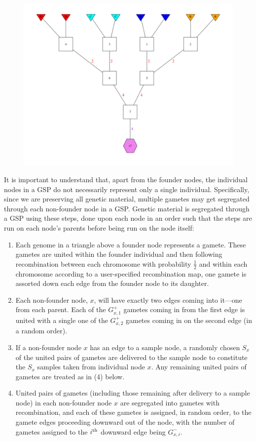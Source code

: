 \begin{figure}
\begin{center}
\includegraphics[width=\columnwidth]{images/gsp4-700.pdf}
\end{center}
\caption[\gspcapone]{\gspcapone}
\label{fig:gsp1}
\end{figure}
It is important to understand that, apart from the founder nodes, the individual
nodes in a GSP do not necessarily represent only a single individual.  Specifically,
since we are preserving all genetic material, multiple gametes may get segregated
through each non-founder node in a GSP\@.   Genetic material is segregated through
a GSP using these steps, done upon each node in an order such that the steps
are run on each node's parents before being run on the node itself:
\begin{enumerate}
\item Each genome in a triangle above a founder node represents a gamete.
These gametes are united within the founder individual and then
following recombination between each chromosome
with probability $\frac{1}{2}$ and within each chromosome according to
a user-specified recombination map, 
 one gamete is assorted down each edge from the founder node to its daughter.
\item Each non-founder node, $x$, will have exactly two edges coming
into it---one from each parent.  Each of the $G^+_{x,1}$ gametes coming in from the
first edge is united with a single one of the $G^+_{x,2}$ gametes coming
in on the second edge (in a random order). 
\item If a non-founder node $x$ has an edge to a sample node,
a randomly chosen $S_x$ of the united pairs of gametes are delivered
to the sample node to constitute the $S_x$ samples taken from individual
node $x$. Any remaining united pairs of gametes are treated as in (4) below.
\item United pairs of gametes (including those remaining after delivery
to a sample node) in each non-founder node $x$ are segregated into
gametes with recombination, and each of these gametes is assigned, in
random order, to the gamete edges proceeding downward out of the node,
with the number of gametes assigned to the $i^\mathrm{th}$ downward edge being
$G^-_{x,i}$. 
\end{enumerate}
